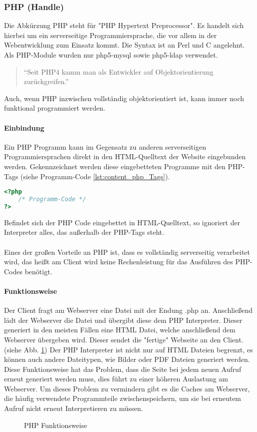 \subsubsection{PHP (Handle)}
Die Abkürzung PHP steht für "PHP Hypertext Preprocessor". Es handelt sich hierbei um ein serverseitige Programmiersprache, die vor allem in der Webentwicklung zum Einsatz kommt. Die Syntax ist an Perl und C angelehnt.\\
Als PHP-Module wurden nur php5-mysql sowie php5-ldap verwendet.\\
\begin{quote}
\enquote{Seit PHP4 kamm man als Entwickler auf Objektorientierung zurückgreifen.} \cite[S. 231]{php5}
\end{quote}
Auch, wenn PHP inzwischen vollständig objektorientiert ist, kann immer noch funktional programmiert werden.
\paragraph{Einbindung\\}
Ein PHP Programm kann im Gegensatz zu anderen serverseitigen Programmiersprachen direkt in den HTML-Quelltext der Website eingebunden werden. Gekennzeichnet werden diese eingebetteten Programme mit den PHP-Tags (siehe Programm-Code \ref{lst:content_php_Tags}).\\
\begin{lstlisting}[style=custom, language=PHP,  caption={PHP-Tags},label={lst:content_php_Tags}]
<?php 
	/* Programm-Code */
?>
\end{lstlisting}
Befindet sich der PHP Code eingebettet in HTML-Quelltext, so ignoriert der Interpreter alles, das außerhalb der PHP-Tags steht.\\\\
Eines der großen Vorteile an PHP ist, dass es vollständig serverseitig verarbeitet wird, das heißt am Client wird keine Rechenleistung für das Ausführen des PHP-Codes benötigt.
\paragraph{Funktionsweise}
Der Client fragt am Webserver eine Datei mit der Endung .php an. Anschließend lädt der Webserver die Datei und übergibt diese dem PHP Interpreter. Dieser generiert in den meisten Fällen eine HTML Datei, welche anschließend dem Webserver übergeben wird. Dieser sendet die "fertige" Webseite an den Client. (siehe Abb. \ref{fig:content_php_PHP_Funktion}) Der PHP Interpreter ist nicht nur auf HTML Dateien begrenzt, es können auch andere Dateitypen, wie Bilder oder PDF Dateien generiert werden. Diese Funktionsweise hat das Problem, dass die Seite bei jedem neuen Aufruf erneut generiert werden muss, dies führt zu einer höheren Auslastung am Webserver. Um dieses Problem zu vermindern gibt es die Caches am Webserver, die häufig verwendete Programmteile zwischenspeichern, um sie bei erneutem Aufruf nicht erneut Interpretieren zu müssen.
\begin{figure}[H]
\centering
{}
\caption{PHP Funktionsweise}
\label{fig:content_php_PHP_Funktion}
\end{figure}
